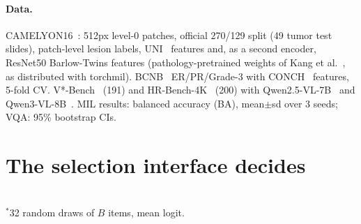 \documentclass[10pt,twocolumn,letterpaper]{article}
\begin{document}
\paragraph{Data.} CAMELYON16~\cite{c16}: 512px level-0 patches, official 270/129 split (49 tumor test slides), patch-level lesion labels, UNI~\cite{uni} features and, as a second encoder, ResNet50 Barlow-Twins features (pathology-pretrained weights of Kang et al.~\cite{kang2023benchmarking}, as distributed with torchmil). BCNB~\cite{bcnb} ER/PR/Grade-3 with CONCH~\cite{conch} features, 5-fold CV. V*-Bench~\cite{wu2024vstar} (191) and HR-Bench-4K~\cite{hrbench} (200) with Qwen2.5-VL-7B~\cite{qwen25vl} and Qwen3-VL-8B~\cite{qwen3vl}. MIL results: balanced accuracy (BA), mean$\pm$sd over 3 seeds; VQA: 95\% bootstrap CIs.

\section{The selection interface decides}\label{sec:audit}
\begin{table}[t]\centering\small
\caption{\textbf{Who chooses the patches decides} (CAMELYON16, BA, 3 seeds; full-slide ABMIL .969). Attacked = a white-box selector picks the $B$ items for the wrong label. Cons.\ = one consultant arguing an assigned label.}\label{tab:c16}
\setlength{\tabcolsep}{3pt}
\\[1pt]{\footnotesize $^\ast$32 random draws of $B$ items, mean logit.}
\end{table}
\end{document}
